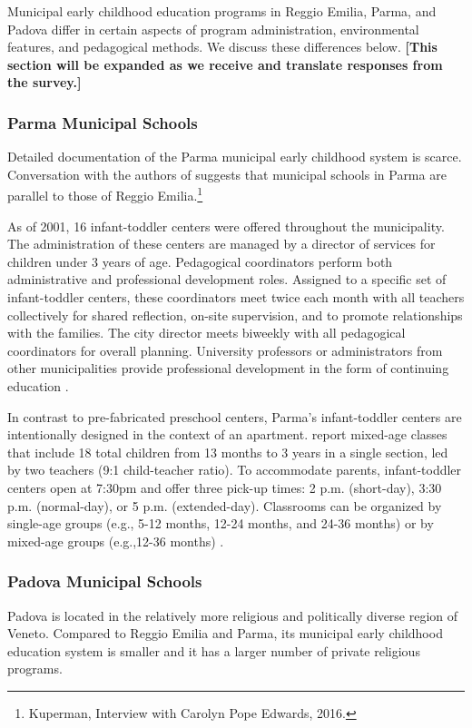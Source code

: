 Municipal early childhood education programs in Reggio Emilia, Parma, and Padova differ in certain aspects of program administration, environmental features, and pedagogical methods. We discuss these differences below. \textbf{[This section will be expanded as we receive and translate responses from the survey.]}

\subsubsection{Parma Municipal Schools}

Detailed documentation of the Parma municipal early childhood system is scarce. Conversation with the authors of \citet{Edwards-etal-eds_1998_Hundred-Languages} suggests that municipal schools in Parma are parallel to those of Reggio Emilia.\footnote{Kuperman, Interview with Carolyn Pope Edwards, 2016.} 

As of 2001, 16 infant-toddler centers were offered throughout the municipality. The administration of these centers are managed by a director of services for children under 3 years of age. Pedagogical coordinators perform both administrative and professional development roles. Assigned to a specific set of infant-toddler centers, these coordinators meet twice each month with all teachers collectively for shared reflection, on-site supervision, and to promote relationships with the families. The city director meets biweekly with all pedagogical coordinators for overall planning. University professors or administrators from other municipalities provide professional development in the form of continuing education \citep{Terzi-Cantarelli_2001_Parma}.

In contrast to pre-fabricated preschool centers, Parma's infant-toddler centers are intentionally designed in the context of an apartment. \citet{Terzi-Cantarelli_2001_Parma} report mixed-age classes that include 18 total children from 13 months to 3 years in a single section, led by two teachers (9:1 child-teacher ratio). To accommodate parents, infant-toddler centers open at 7:30pm and offer three pick-up times: 2 p.m. (short-day), 3:30 p.m. (normal-day), or 5 p.m. (extended-day). Classrooms can be organized by single-age groups (e.g., 5-12 months, 12-24 months, and 24-36 months) or by mixed-age groups (e.g.,12-36 months) \citep{Majorano-etal_2009_CC-in-P}.

\subsubsection{Padova Municipal Schools}
Padova is located in the relatively more religious and politically diverse region of Veneto. Compared to Reggio Emilia and Parma, its municipal early childhood education system is smaller and it has a larger number of private religious programs. 

